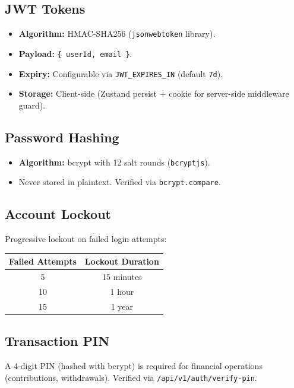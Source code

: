 \documentclass[11pt,a4paper]{article}
\begin{document}
\subsection{JWT Tokens}

\begin{itemize}[nosep]
  \item \textbf{Algorithm:} HMAC-SHA256 (\texttt{jsonwebtoken} library).
  \item \textbf{Payload:} \texttt{\{ userId, email \}}.
  \item \textbf{Expiry:} Configurable via \texttt{JWT\_EXPIRES\_IN}
        (default \texttt{7d}).
  \item \textbf{Storage:} Client-side (Zustand persist + cookie for
        server-side middleware guard).
\end{itemize}

\subsection{Password Hashing}

\begin{itemize}[nosep]
  \item \textbf{Algorithm:} bcrypt with 12 salt rounds (\texttt{bcryptjs}).
  \item Never stored in plaintext. Verified via \texttt{bcrypt.compare}.
\end{itemize}

\subsection{Account Lockout}

Progressive lockout on failed login attempts:
\begin{table}[h]
  \centering
  \begin{tabular}{cc}
    \toprule
    Failed Attempts & Lockout Duration \\
    \midrule
    5  & 15 minutes \\
    10 & 1 hour \\
    15 & 1 year \\
    \bottomrule
  \end{tabular}
\end{table}

\subsection{Transaction PIN}

A 4-digit PIN (hashed with bcrypt) is required for financial operations
(contributions, withdrawals). Verified via \texttt{/api/v1/auth/verify-pin}.
\end{document}
